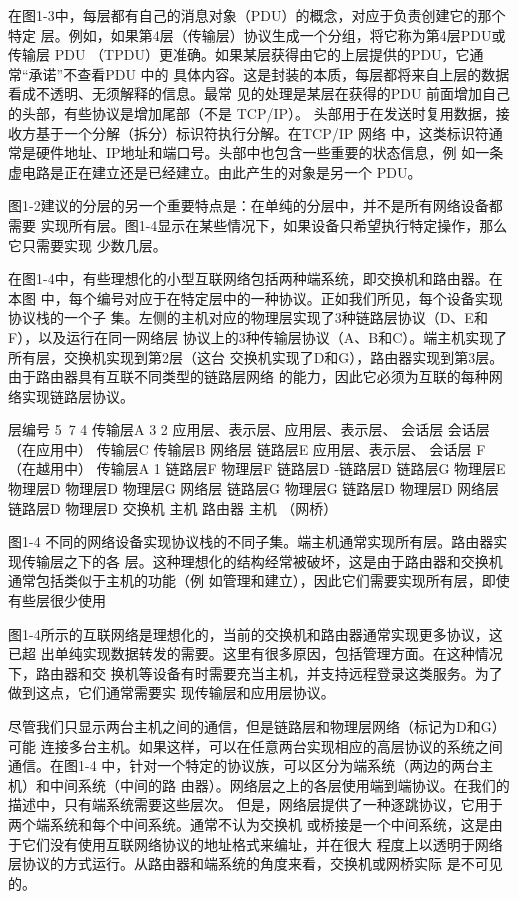 在图1-3中，每层都有自己的消息对象（PDU）的概念，对应于负责创建它的那个特定
层。例如，如果第4层（传输层）协议生成一个分组，将它称为第4层PDU或传输层 PDU
（TPDU）更准确。如果某层获得由它的上层提供的PDU，它通常“承诺”不查看PDU 中的
具体内容。这是封装的本质，每层都将来自上层的数据看成不透明、无须解释的信息。最常
见的处理是某层在获得的PDU 前面增加自己的头部，有些协议是增加尾部（不是 TCP/IP）。
头部用于在发送时复用数据，接收方基于一个分解（拆分）标识符执行分解。在TCP/IP 网络
中，这类标识符通常是硬件地址、IP地址和端口号。头部中也包含一些重要的状态信息，例
如一条虚电路是正在建立还是已经建立。由此产生的对象是另一个 PDU。

图1-2建议的分层的另一个重要特点是：在单纯的分层中，并不是所有网络设备都需要
实现所有层。图1-4显示在某些情况下，如果设备只希望执行特定操作，那么它只需要实现
少数几层。

在图1-4中，有些理想化的小型互联网络包括两种端系统，即交换机和路由器。在本图
中，每个编号对应于在特定层中的一种协议。正如我们所见，每个设备实现协议栈的一个子
集。左侧的主机对应的物理层实现了3种链路层协议（D、E和F），以及运行在同一网络层
协议上的3种传输层协议（A、B和C）。端主机实现了所有层，交换机实现到第2层（这台
交换机实现了D和G），路由器实现到第3层。由于路由器具有互联不同类型的链路层网络
的能力，因此它必须为互联的每种网络实现链路层协议。

层编号
5~7
4
传输层A
3
2
应用层、表示层、应用层、表示层、
会话层
会话层
（在应用中）
传输层C
传输层B
网络层
链路层E
应用层、表示层、
会话层
F（在越用中）
传输层A
1
链路层F
物理层F
链路层D
-链路层D
链路层G
物理层E
物理层D
物理层D
物理层G
网络层
链路层G
物理层G
链路层D
物理层D
网络层
链路层D
物理层D
交换机
主机
路由器
主机
（网桥）

图1-4 不同的网络设备实现协议栈的不同子集。端主机通常实现所有层。路由器实现传输层之下的各
层。这种理想化的结构经常被破坏，这是由于路由器和交换机通常包括类似于主机的功能（例
如管理和建立），因此它们需要实现所有层，即使有些层很少使用

图1-4所示的互联网络是理想化的，当前的交换机和路由器通常实现更多协议，这已超
出单纯实现数据转发的需要。这里有很多原因，包括管理方面。在这种情况下，路由器和交
换机等设备有时需要充当主机，并支持远程登录这类服务。为了做到这点，它们通常需要实
现传输层和应用层协议。

尽管我们只显示两台主机之间的通信，但是链路层和物理层网络（标记为D和G）可能
连接多台主机。如果这样，可以在任意两台实现相应的高层协议的系统之间通信。在图1-4
中，针对一个特定的协议族，可以区分为端系统（两边的两台主机）和中间系统（中间的路
由器）。网络层之上的各层使用端到端协议。在我们的描述中，只有端系统需要这些层次。
但是，网络层提供了一种逐跳协议，它用于两个端系统和每个中间系统。通常不认为交换机
或桥接是一个中间系统，这是由于它们没有使用互联网络协议的地址格式来编址，并在很大
程度上以透明于网络层协议的方式运行。从路由器和端系统的角度来看，交换机或网桥实际
是不可见的。

